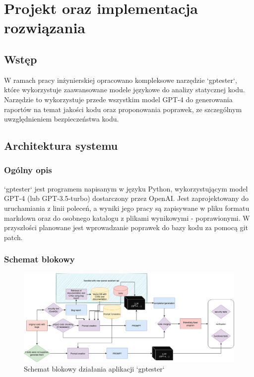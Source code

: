 
\chapter{Projekt oraz implementacja rozwiązania}

\section{Wstęp}
W ramach pracy inżynierskiej opracowano kompleksowe narzędzie `gptester`, które wykorzystuje zaawansowane modele językowe do analizy statycznej kodu.
Narzędzie to wykorzystuje przede wszystkim model GPT-4 do generowania raportów na temat jakości kodu oraz proponowania poprawek, ze szczególnym uwzględnieniem bezpieczeństwa kodu.

\section{Architektura systemu}
\subsection{Ogólny opis}
`gptester` jest programem napisanym w języku Python, wykorzystującym model GPT-4 (lub GPT-3.5-turbo) dostarczony przez OpenAI.
Jest zaprojektowany do uruchamiania z linii poleceń, a wyniki jego pracy są zapisywane w pliku formatu markdown oraz do osobnego katalogu z plikami wynikowymi - poprawionymi.
W przyszłości planowane jest wprowadzanie poprawek do bazy kodu za pomocą git patch.

\subsection{Schemat blokowy}
\label{subsec:schemat_blokowy}

\begin{landscape}
\begin{figure}[p]
    \centering
    \includegraphics[width=\linewidth]{img/gptester.drawio.png}
    \caption{Schemat blokowy działania aplikacji `gptester`}
    \label{fig:schemat_blokowy}
\end{figure}
\end{landscape}

